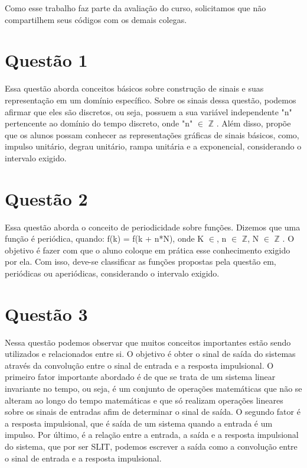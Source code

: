 \documentclass[12pt,a4paper]{report}
\begin{document}
Como esse trabalho faz parte da avaliação do curso, solicitamos que não compartilhem seus códigos com os demais colegas.

\section*{Questão 1}
Essa questão aborda conceitos básicos sobre construção de sinais e suas representação em um domínio específico. Sobre os sinais dessa questão, podemos afirmar que eles são discretos, ou seja, possuem a sua variável independente "n" pertencente ao domínio do tempo discreto, onde "n" $\in$  $\mathbb{Z}$ . Além disso, propõe que os alunos possam conhecer as representações gráficas de sinais básicos, como, impulso unitário, degrau unitário, rampa unitária e a exponencial, considerando o intervalo exigido.  

\section*{Questão 2}
Essa questão aborda o conceito de periodicidade sobre funções. Dizemos que uma função é periódica, quando: f(k) = f(k + n*N), onde K $\in$, n $\in$ $\mathbb{Z}$, N $\in$ $\mathbb{Z}$ .
O objetivo é fazer com que o aluno coloque em prática esse conhecimento exigido por ela. Com isso, deve-se classificar as funções propostas pela questão em, periódicas ou aperiódicas, considerando o intervalo exigido.

\section*{Questão 3}
Nessa questão podemos observar que muitos conceitos importantes estão sendo utilizados e relacionados entre si. O objetivo é obter o sinal de saída do sistemas através da convolução entre o sinal de entrada e a resposta impulsional. O primeiro fator importante abordado é de que se trata de um sistema linear invariante no tempo, ou seja, é um conjunto de operações matemáticas que não se alteram ao longo do tempo matemáticas e que só realizam operações lineares sobre os sinais de entradas afim de determinar o sinal de saída. O segundo fator é a resposta impulsional, que é saída de um sistema quando a entrada é um impulso. Por último, é a relação entre a entrada, a saída e a resposta impulsional do sistema, que por ser SLIT, podemos escrever a saída como a convolução entre o sinal de entrada e a resposta impulsional.
\end{document}
